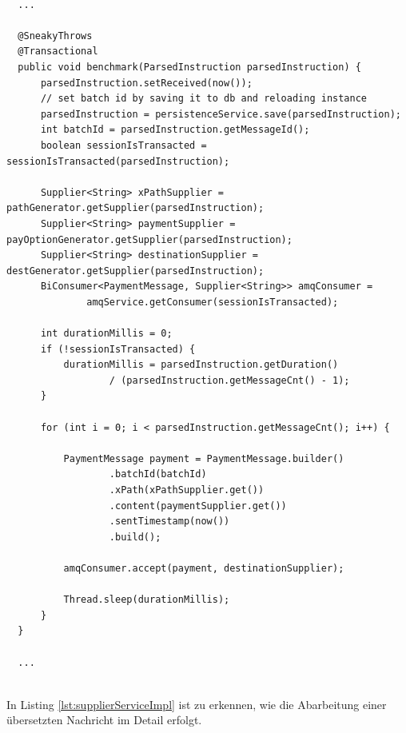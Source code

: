 \begin{lstlisting}[style=javaStyle,caption={Supplier - Service},label=lst:supplierServiceImpl]

  ...

  @SneakyThrows
  @Transactional
  public void benchmark(ParsedInstruction parsedInstruction) {
      parsedInstruction.setReceived(now());
      // set batch id by saving it to db and reloading instance
      parsedInstruction = persistenceService.save(parsedInstruction);
      int batchId = parsedInstruction.getMessageId();
      boolean sessionIsTransacted = sessionIsTransacted(parsedInstruction);

      Supplier<String> xPathSupplier = pathGenerator.getSupplier(parsedInstruction);
      Supplier<String> paymentSupplier = payOptionGenerator.getSupplier(parsedInstruction);
      Supplier<String> destinationSupplier = destGenerator.getSupplier(parsedInstruction);
      BiConsumer<PaymentMessage, Supplier<String>> amqConsumer =
              amqService.getConsumer(sessionIsTransacted);

      int durationMillis = 0;
      if (!sessionIsTransacted) {
          durationMillis = parsedInstruction.getDuration()
                  / (parsedInstruction.getMessageCnt() - 1);
      }

      for (int i = 0; i < parsedInstruction.getMessageCnt(); i++) {

          PaymentMessage payment = PaymentMessage.builder()
                  .batchId(batchId)
                  .xPath(xPathSupplier.get())
                  .content(paymentSupplier.get())
                  .sentTimestamp(now())
                  .build();

          amqConsumer.accept(payment, destinationSupplier);

          Thread.sleep(durationMillis);
      }
  }

  ...
  
\end{lstlisting}

In Listing \ref{lst:supplierServiceImpl} ist zu erkennen, wie die Abarbeitung einer übersetzten Nachricht im Detail erfolgt.

